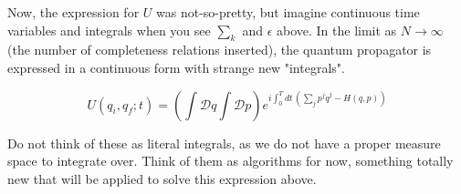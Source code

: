 \noindent Now, the expression for $U$ was not-so-pretty, but imagine continuous time variables and integrals when you see $\sum_k$ and $\epsilon$ above. In the limit as $N \rightarrow \infty$ (the number of completeness relations inserted), the quantum propagator is expressed in a continuous form with strange new "integrals".

\begin{equation}
U(q_i, q_f; t) = \left( \int \mathcal{D}q \int \mathcal{D} p \right) e^{i \int_0^T dt \, (\sum_j p^j \dot{q}^j - H(q,p))}
\end{equation}

\noindent Do not think of these as literal integrals, as we do not have a proper measure space to integrate over. Think of them as algorithms for now, something totally new that will be applied to solve this expression above.